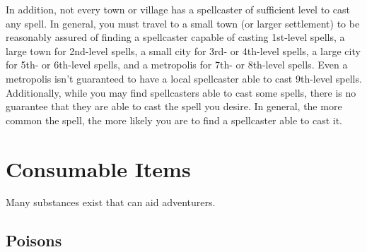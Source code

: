         \par In addition, not every town or village has a spellcaster of sufficient level to cast any spell. In general, you must travel to a small town (or larger settlement) to be reasonably assured of finding a spellcaster capable of casting 1st-level spells, a large town for 2nd-level spells, a small city for 3rd- or 4th-level spells, a large city for 5th- or 6th-level spells, and a metropolis for 7th- or 8th-level spells. Even a metropolis isn't guaranteed to have a local spellcaster able to cast 9th-level spells. Additionally, while you may find spellcasters able to cast some spells, there is no guarantee that they are able to cast the spell you desire. In general, the more common the spell, the more likely you are to find a spellcaster able to cast it.

\section{Consumable Items}\label{Consumable Items}

    Many substances exist that can aid adventurers.

    \subsection{Poisons}\label{Poisons}

